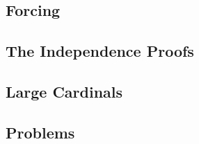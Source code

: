 
\subsection{Forcing}


\subsection{The Independence Proofs}


\subsection{Large Cardinals}


\subsection{Problems}

